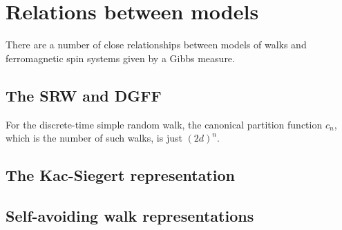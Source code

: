
\section{Relations between models}

There are a number of close relationships between models of walks and ferromagnetic spin
systems given by a Gibbs measure.


\subsection{The SRW and DGFF}


For the discrete-time simple random walk, the canonical partition function $c_n$,
which is the number of such walks, is just $(2 d)^n$.


\subsection{The Kac-Siegert representation}



\subsection{Self-avoiding walk representations}

